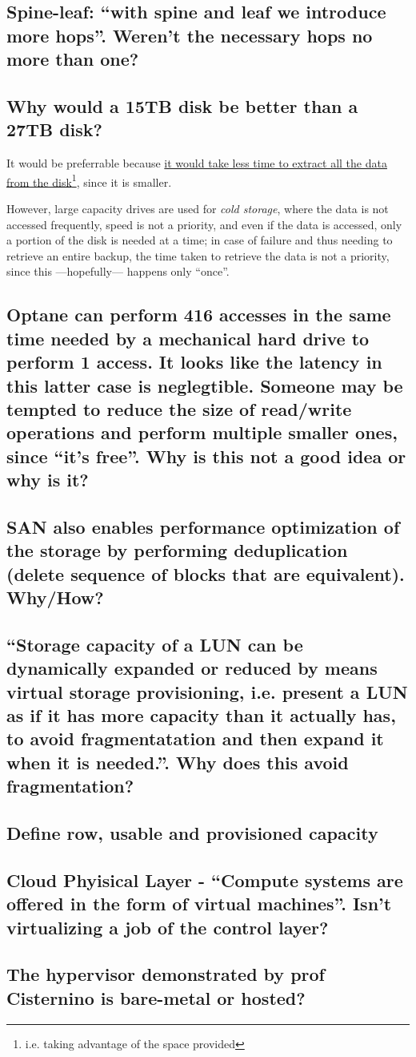 \subsection{Spine-leaf: ``with spine and leaf we introduce \textbf{more hops}''. Weren't the necessary hops no more than one?}

\subsection{Why would a 15TB disk be better than a 27TB disk?}
It would be preferrable because \ul{it would take less time to extract all the data from the disk}\footnote{i.e. taking advantage of the space provided}, since it is smaller.

However, large capacity drives are used for \textit{cold storage}, where the data is not accessed frequently, speed is not a priority, and even if the data is accessed, only a portion of the disk is needed at a time; in case of failure and thus needing to retrieve an entire backup, the time taken to retrieve the data is not a priority, since this ---hopefully--- happens only ``once''.

\subsection{Optane can perform 416 accesses in the same time needed by a mechanical hard drive to perform 1 access. It looks like the latency in this latter case is neglegtible. Someone may be tempted to reduce the size of read/write operations and perform multiple smaller ones, since ``it's free''. Why is this not a good idea or why is it?}

\subsection{SAN also enables performance optimization of the storage by performing
deduplication (delete sequence of blocks that are equivalent). Why/How?}

\subsection{``Storage \textbf{capacity} of a LUN can be dynamically expanded or reduced by means \textbf{virtual storage provisioning}, i.e. present a LUN as if it has more capacity than it actually has, to avoid fragmentatation and then expand it when it is needed.''. Why does this avoid fragmentation?}

\subsection{Define row, usable and provisioned capacity}

\subsection{Cloud Phyisical Layer - ``Compute systems are offered in the form of virtual machines''. Isn't virtualizing a job of the control layer?}

\subsection{The hypervisor demonstrated by prof Cisternino is bare-metal or hosted?}